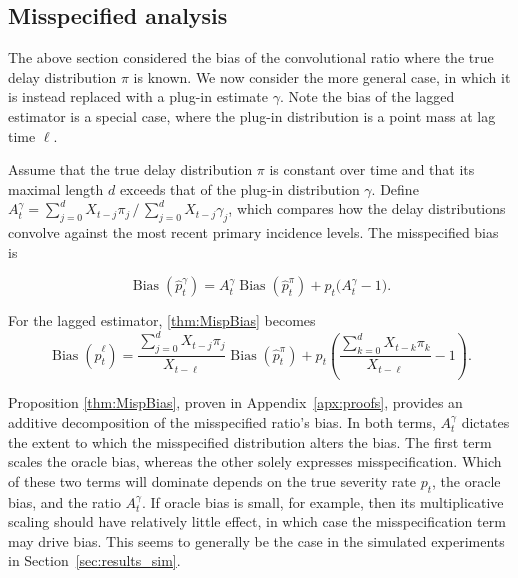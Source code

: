 \documentclass{article}
\renewcommand{\hat}{\widehat} %
\DeclareMathOperator{\bias}{Bias}
\begin{document}
\subsection{Misspecified analysis}\label{sec:misp}

The above section considered the bias of the convolutional ratio where the true delay distribution $\pi$ is known. We now consider the more general case, in which it is instead replaced with a plug-in estimate $\gamma$. Note the bias of the lagged estimator is a special case, where the plug-in distribution is a point mass at lag time $\ell$. 

\begin{proposition}\label{thm:MispBias}
Assume that the true delay distribution $\pi$ is constant over time and that its maximal length $d$ exceeds that of the plug-in distribution $\gamma$. 
Define $A_t^\gamma = \sum_{j=0}^d X_{t-j}\pi_j\, \big/\, \sum_{j=0}^d X_{t-j}\gamma_j$, which compares how the delay distributions convolve against the most recent primary incidence levels. The misspecified bias is

\begin{equation*}
          \bias\left(\hat{p}_t^\gamma\right) = A_t^\gamma\bias\left(\hat{p}_t^\pi\right) + p_t\big( A_t^\gamma-1\big).
\end{equation*}
\end{proposition}

For the lagged estimator, \eqref{thm:MispBias} becomes
\begin{equation}\label{eq:LagBias}
         \bias\left(\hat{p}_t^\ell\right) = \frac{\sum_{j=0}^d X_{t-j}\pi_j}{X_{t-\ell}}\bias\left(\hat{p}_t^\pi\right) + p_t\left( \frac{\sum_{k=0}^d X_{t-k}\pi_k}{X_{t-\ell}}-1\right).
\end{equation}

Proposition \ref{thm:MispBias}, proven in Appendix~\ref{apx:proofs}, provides an
additive decomposition of the misspecified ratio's bias. In both terms,
$A_t^\gamma$ dictates the extent to which the misspecified distribution alters
the bias. The first term scales the oracle bias, whereas the other solely
expresses misspecification. Which of these two terms will dominate depends on
the true severity rate $p_t$, the oracle bias, and the ratio $A_t^\gamma$. If
oracle bias is small, for example, then its multiplicative scaling should have
relatively little effect, in which case the misspecification term may drive
bias. This seems to generally be the case in the simulated experiments in
Section~\ref{sec:results_sim}.
\end{document}
